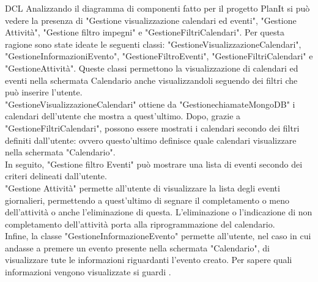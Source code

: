 \begin{listaPersonale}{DCL}
    Analizzando il diagramma di componenti fatto per il progetto PlanIt si può vedere la presenza di "Gestione visualizzazione calendari ed eventi", "Gestione Attività", "Gestione filtro impegni" e "GestioneFiltriCalendari". Per questa ragione sono state ideate le seguenti classi: "GestioneVisualizzazioneCalendari",  "GestioneInformazioniEvento", "GestioneFiltroEventi", "GestioneFiltriCalendari" e "GestioneAttività". Queste classi permettono la visualizzazione di calendari ed eventi nella schermata Calendario  anche visualizzandoli seguendo dei filtri che può inserire l'utente.\\
    "GestioneVisualizzazioneCalendari" ottiene da "GestionechiamateMongoDB" i calendari dell'utente che mostra a quest'ultimo. Dopo, grazie a "GestioneFiltriCalendari", possono essere mostrati i calendari secondo dei filtri definiti dall'utente: ovvero questo'ultimo definisce quale calendari visualizzare nella schermata "Calendario".\\
    In seguito, "Gestione filtro Eventi" può mostrare una lista di eventi secondo dei criteri delineati dall'utente.\\
    "Gestione Attività"  permette all'utente di visualizzare la lista degli eventi giornalieri, permettendo a quest'ultimo di segnare il completamento o meno dell'attività o anche l'eliminazione di questa. L'eliminazione o l'indicazione di non completamento dell'attività porta alla riprogrammazione del calendario.\\
    Infine, la classe "GestioneInformazioneEvento" permette all'utente, nel caso in cui andasse a premere un evento presente nella schermata "Calendario", di visualizzare tute le informazioni riguardanti l'evento creato. Per sapere quali informazioni vengono visualizzate si guardi .
    \begin{center}
        
    \end{center}
    \newpage



\end{listaPersonale}
